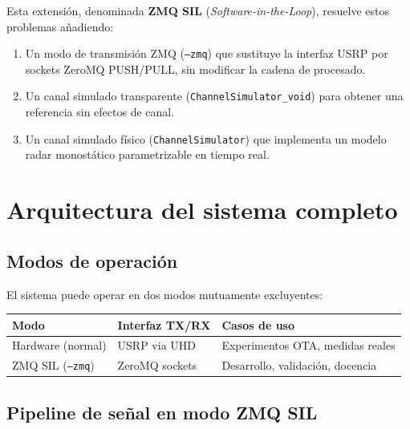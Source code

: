\documentclass[11pt,a4paper]{article}
\begin{document}
Esta extensión, denominada \textbf{ZMQ SIL} (\textit{Software-in-the-Loop}), resuelve
estos problemas añadiendo:
\begin{enumerate}
  \item Un modo de transmisión ZMQ (\texttt{--zmq}) que sustituye la interfaz USRP por
        sockets ZeroMQ PUSH/PULL, sin modificar la cadena de procesado.
  \item Un canal simulado transparente (\texttt{ChannelSimulator\_void}) para obtener una
        referencia sin efectos de canal.
  \item Un canal simulado físico (\texttt{ChannelSimulator}) que implementa un modelo
        radar monostático parametrizable en tiempo real.
\end{enumerate}

\section{Arquitectura del sistema completo}

\subsection{Modos de operación}

El sistema puede operar en dos modos mutuamente excluyentes:

\begin{center}
\begin{tabular}{lll}
\toprule
\textbf{Modo} & \textbf{Interfaz TX/RX} & \textbf{Casos de uso} \\
\midrule
Hardware (normal) & USRP via UHD & Experimentos OTA, medidas reales \\
ZMQ SIL (\texttt{--zmq}) & ZeroMQ sockets & Desarrollo, validación, docencia \\
\bottomrule
\end{tabular}
\end{center}

\subsection{Pipeline de señal en modo ZMQ SIL}
\end{document}
